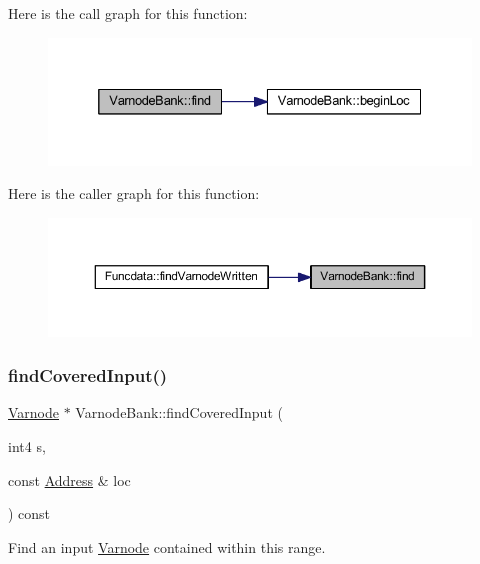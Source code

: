 Here is the call graph for this function\+:
\nopagebreak
\begin{figure}[H]
\begin{center}
\leavevmode
\includegraphics[width=332pt]{class_varnode_bank_a056ab94c55c202947cdaf9ccce709d01_cgraph}
\end{center}
\end{figure}
Here is the caller graph for this function\+:
\nopagebreak
\begin{figure}[H]
\begin{center}
\leavevmode
\includegraphics[width=350pt]{class_varnode_bank_a056ab94c55c202947cdaf9ccce709d01_icgraph}
\end{center}
\end{figure}
\mbox{\label{class_varnode_bank_aacfc015d8ce76e8f1cacd6da9c7cd93f}} 
\subsubsection{\texorpdfstring{findCoveredInput()}{findCoveredInput()}}
{\footnotesize\ttfamily \mbox{\hyperlink{class_varnode}{Varnode}} $\ast$ Varnode\+Bank\+::find\+Covered\+Input (\begin{DoxyParamCaption}\item[{int4}]{s,  }\item[{const \mbox{\hyperlink{class_address}{Address}} \&}]{loc }\end{DoxyParamCaption}) const}



Find an input \mbox{\hyperlink{class_varnode}{Varnode}} contained within this range. 

